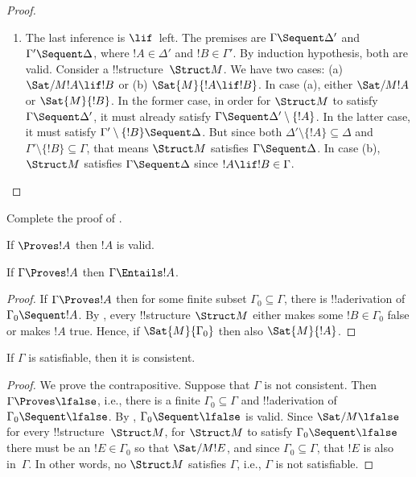 \documentclass[../../../include/open-logic-section]{subfiles}
\begin{document}
\begin{proof}
\begin{enumerate}
\item The last inference is $\lif$~left.  The premises are $\Gamma
  \Sequent \Delta'$ and $\Gamma' \Sequent \Delta$, where $!A \in
  \Delta'$ and $!B \in \Gamma'$.  By induction hypothesis, both are
  valid.  Consider a !!{structure}~$\Struct M$.  We have two cases:
  (a) $\Sat/{M}{!A \lif !B}$ or (b) $\Sat{M}{!A \lif !B}$.  In case
  (a), either $\Sat/{M}{!A}$ or $\Sat{M}{!B}$.  In the former case, in
  order for $\Struct M$ to satisfy $\Gamma \Sequent \Delta'$, it must
  already satisfy $\Gamma \Sequent \Delta' \setminus \{!A\}$.  In the
  latter case, it must satisfy $\Gamma' \setminus \{!B\} \Sequent
  \Delta$.  But since both $\Delta' \setminus \{!A\} \subseteq \Delta$
  and $\Gamma' \setminus \{!B\} \subseteq \Gamma$, that means $\Struct
  M$ satisfies $\Gamma \Sequent \Delta$.  In case (b), $\Struct M$
  satisfies $\Gamma \Sequent \Delta$ since $!A \lif !B \in \Gamma$.
\end{enumerate}
\end{proof}

\begin{prob}
Complete the proof of .
\end{prob}

\begin{cor}
If $\Proves !A$ then $!A$ is valid.
\end{cor}

\begin{cor}
If $\Gamma \Proves !A$ then $\Gamma \Entails !A$.
\end{cor}

\begin{proof}
If $\Gamma \Proves !A$ then for some finite subset $\Gamma_0 \subseteq
\Gamma$, there is !!a{derivation} of $\Gamma_0 \Sequent !A$.  By
, every !!{structure} $\Struct M$ either
makes some $!B \in \Gamma_0$ false or makes $!A$ true.  Hence, if
$\Sat{M}{\Gamma_0}$ then also $\Sat{M}{!A}$.
\end{proof}

\begin{cor}
If $\Gamma$ is satisfiable, then it is consistent.
\end{cor}

\begin{proof}
We prove the contrapositive.  Suppose that $\Gamma$ is not
consistent.  Then $\Gamma \Proves \lfalse$, i.e., there is a finite
$\Gamma_0 \subseteq \Gamma$ and !!a{derivation} of $\Gamma_0 \Sequent
\lfalse$.  By , $\Gamma_0 \Sequent \lfalse$ is
valid.  Since $\Sat/{M}{\lfalse}$ for every !!{structure}~$\Struct M$,
for $\Struct M$ to satisfy $\Gamma_0 \Sequent \lfalse$ there must be
an $!E \in \Gamma_0$ so that $\Sat/{M}{!E}$, and since $\Gamma_0
\subseteq \Gamma$, that $!E$ is also in~$\Gamma$.  In other words, no
$\Struct M$ satisfies $\Gamma$, i.e., $\Gamma$ is not satisfiable.
\end{proof}
\end{document}
